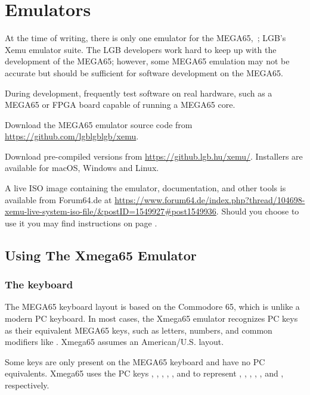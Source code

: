 \chapter{Emulators}

At the time of writing, there is only one emulator for the MEGA65,\ ; LGB's Xemu emulator suite. The LGB developers work hard to keep up with the development of the MEGA65; however, some MEGA65 emulation may not be accurate but should be sufficient for software development on the MEGA65.


During development, frequently test software on real hardware, such as a MEGA65 or FPGA board capable of running a MEGA65 core.

Download the MEGA65 emulator source code from \url{https://github.com/lgblgblgb/xemu}.

Download pre-compiled versions from \url{https://github.lgb.hu/xemu/}. Installers are
available for macOS, Windows and Linux.

A live ISO image containing the emulator, documentation, and other tools is available from
Forum64.de
at \url{https://www.forum64.de/index.php?thread/104698-xemu-live-system-iso-file/\&postID=1549927\#post1549936}.
Should you choose to use it you may find instructions on page \pageref{sec:live-iso-image}.

\section{Using The Xmega65 Emulator}

\subsection{The keyboard}

The MEGA65 keyboard layout is based on the Commodore 65, which is unlike a modern PC
keyboard. In most cases, the Xmega65 emulator recognizes PC keys as their equivalent
MEGA65 keys, such as letters, numbers, and common modifiers like .
Xmega65 assumes an American/U.S. layout.

Some keys are only present on the MEGA65 keyboard and have no PC equivalents. Xmega65
uses the PC keys , , ,
, , and  to represent
\megakey{+}, \megakey{\pounds}, , ,
, and , respectively.

